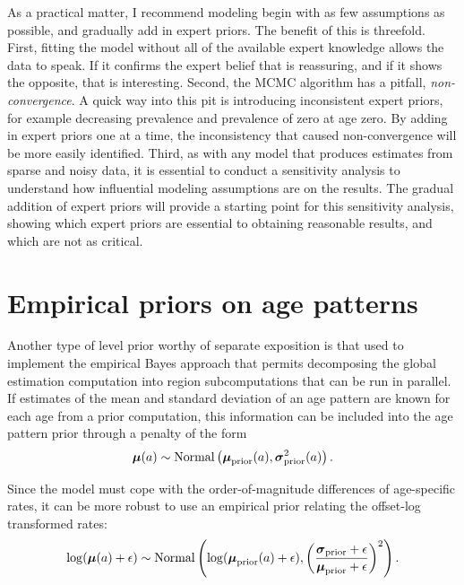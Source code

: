 As a practical matter, I recommend modeling begin with as few
assumptions as possible, and gradually add in expert priors. The
benefit of this is threefold.  First, fitting the model without all of
the available expert knowledge allows the data to speak.  If it
confirms the expert belief that is reassuring, and if it shows the
opposite, that is interesting. Second, the MCMC algorithm has a
pitfall, \emph{non-convergence}. A quick way into this pit is
introducing inconsistent expert priors, for example decreasing
prevalence and prevalence of zero at age zero. By adding in expert
priors one at a time, the inconsistency that caused non-convergence
will be more easily identified. Third, as with any model that produces
estimates from sparse and noisy data, it is essential to conduct a
sensitivity analysis to understand how influential modeling
assumptions are on the results.  The gradual addition of expert priors
will provide a starting point for this sensitivity analysis, showing
which expert priors are essential to obtaining reasonable results, and
which are not as critical.

\section{Empirical priors on age patterns}
Another type of level prior worthy of separate exposition is that used
to implement the empirical Bayes approach that permits decomposing the
global estimation computation into region subcomputations that can be
run in parallel.  If estimates of the mean and standard deviation of
an age pattern are known for each age from a prior computation, this
information can be included into the age pattern prior through a
penalty of the form
\[
\boldsymbol{\mu}(a) \sim \operatorname{Normal}\left(\boldsymbol{\mu}_{\text{prior}}(a),
\boldsymbol{\sigma}_{\text{prior}}^2(a)\right).
\]

Since the model must cope with the order-of-magnitude differences of age-specific rates, it can be more robust to use an empirical prior relating the offset-log transformed rates:
\[
\log(\boldsymbol{\mu}(a)+\epsilon) \sim \operatorname{Normal}\left(\log(\boldsymbol{\mu}_{\text{prior}}(a)+\epsilon),
\left(\frac{\boldsymbol{\sigma}_{\text{prior}}+\epsilon}{\boldsymbol{\mu}_{\text{prior}}+\epsilon}\right)^2\right).
\]
